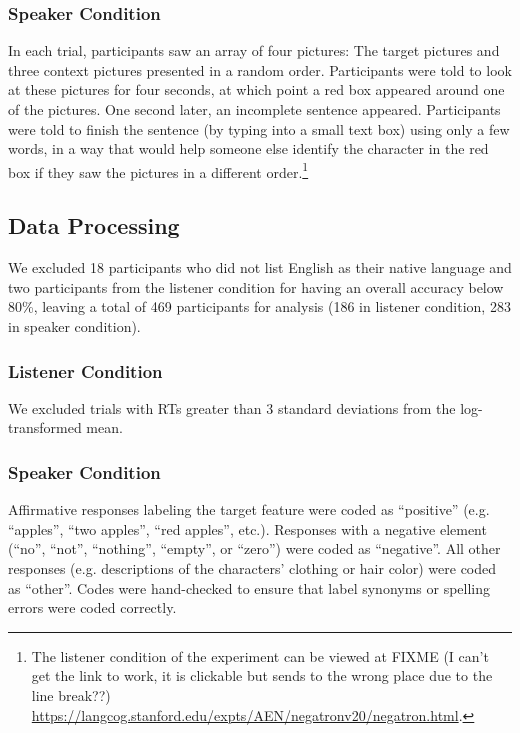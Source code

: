 \documentclass[man]{apa2}
\begin{document}
\subsubsection{Speaker Condition}

In each trial, participants saw an array of four pictures: The target pictures and three context pictures presented in a random order.  Participants were told to look at these pictures for four seconds, at which point a red box appeared around one of the pictures.  One second later, an incomplete sentence appeared.  Participants were told to finish the sentence (by typing into a small text box) using only a few words, in a way that would help someone else identify the character in the red box if they saw the pictures in a different order.\footnote{The listener condition of the experiment can be viewed at 
FIXME (I can't get the link to work, it is clickable but sends to the wrong place due to the line break??) \url{https://langcog.stanford.edu/expts/AEN/negatronv20/negatron.html}.}
  

 
 \subsection{Data Processing} 
  
We excluded 18 participants who did not list English as their native language and two participants from the listener condition for having an overall accuracy below 80\%, leaving a total of 469 participants for analysis (186 in listener condition, 283 in speaker condition). 

\subsubsection{Listener Condition}
We excluded trials with RTs greater than 3 standard deviations from the log-transformed mean.  

\subsubsection{Speaker Condition}
Affirmative responses labeling the target feature were coded as ``positive'' (e.g. ``apples'', ``two apples'', ``red apples'', etc.).  Responses with a negative element (``no'', ``not'', ``nothing'', ``empty'', or ``zero'') were coded as ``negative''.  All other responses (e.g. descriptions of the characters' clothing or hair color) were coded as ``other''.  Codes were hand-checked to ensure that label synonyms or spelling errors were coded correctly.  
\end{document}
